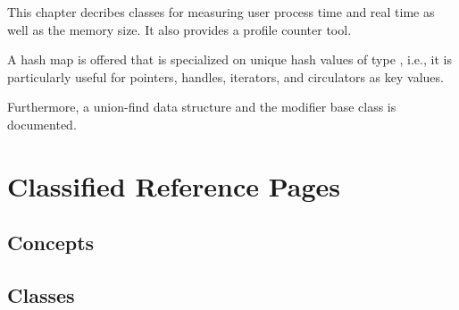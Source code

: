 %
%
\label{chap:hash_map}


This chapter decribes classes for measuring user process time and real time
as well as the memory size. It also provides a profile counter tool.

A hash map  is offered that is specialized
on unique hash values of type , i.e., it is
particularly useful for pointers, handles, iterators, and circulators
as key values.

Furthermore, a union-find data structure and the modifier base class
is documented.

\section{Classified Reference Pages}

\subsection*{Concepts}


\subsection*{Classes}

 \\
 \\
 \\
 \\

\\



